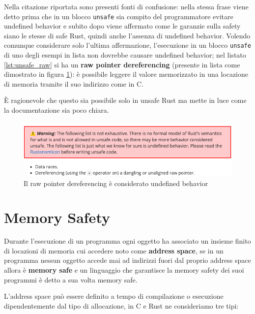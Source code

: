 \documentclass[Lau,binding=0.6cm]{sapthesis}
\newcommand{\textcode}[1]{\colorbox{backcolour}{\texttt{#1}}}
\begin{document}
Nella citazione riportata sono presenti fonti di confusione: nella stessa frase viene detto prima che in un blocco \textcode{unsafe} sia compito del programmatore evitare undefined behavior e subito dopo viene affermato come le garanzie sulla safety siano le stesse di safe Rust, quindi anche l'assenza di undefined behavior. 
Volendo comunque considerare solo l'ultima affermazione, l'esecuzione in un blocco \textcode{unsafe} di uno degli esempi in lista non dovrebbe causare undefined behavior; nel listato \ref{lst:unsafe_raw} si ha un \textbf{raw pointer dereferencing} (presente in lista come dimostrato in figura \ref{fig:warning}): è possibile leggere il valore memorizzato in una locazione di memoria tramite il suo indirizzo come in C.

È ragionevole che questo sia possibile solo in unsafe Rust ma mette in luce come la documentazione sia poco chiara. 




\begin{figure}[h!t]
    \centering
    \includegraphics[scale=0.52]{images/warning_undefined_behavior.png}
    \caption{Il raw pointer dereferencing è considerato undefined behavior}
    \label{fig:warning}
\end{figure}


\chapter{Memory Safety} \label{chap:memory_safety}

Durante l'esecuzione di un programma ogni oggetto ha associato un insieme finito di locazioni di memoria cui accedere noto come \textbf{address space}, se in un programma nessun oggetto accede mai ad indirizzi fuori dal proprio address space allora è \textbf{memory safe} e un linguaggio che garantisce la memory safety dei suoi programmi è detto a sua volta memory safe.

L'address space può essere definito a tempo di compilazione o esecuzione dipendentemente dal tipo di allocazione, in C e Rust ne consideriamo tre tipi:
\end{document}
